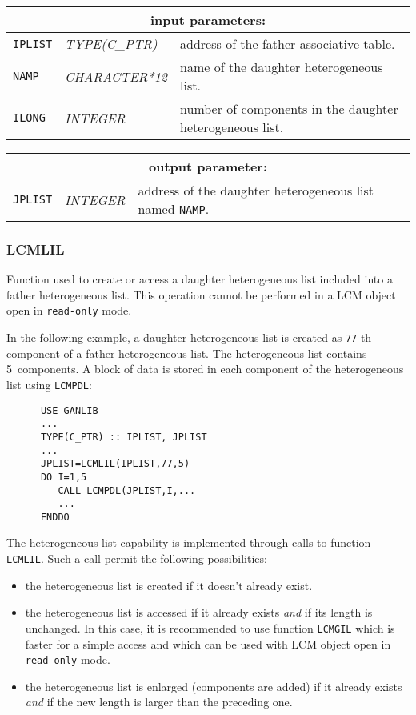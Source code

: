 \noindent
\begin{tabular}{|p{1.5cm}|p{3cm}|p{10cm}|}
\hline
\multicolumn{3}{|c|}{\bf input parameters:} \\
\hline
{\tt IPLIST} & {\it TYPE(C\_PTR)} & address of the father associative table. \\
\hline
{\tt NAMP} & {\it CHARACTER*12} & name of the daughter heterogeneous list. \\
\hline
{\tt ILONG} & {\it INTEGER} & number of components in the daughter heterogeneous list. \\
\hline
\end{tabular}

\vskip 0.8cm

\noindent
\begin{tabular}{|p{1.5cm}|p{3cm}|p{10cm}|}
\hline
\multicolumn{3}{|c|}{\bf output parameter:} \\
\hline
{\tt JPLIST} & {\it INTEGER} & address of the daughter heterogeneous list named {\tt NAMP}. \\
\hline
\end{tabular}

\subsubsection{LCMLIL}

Function used to create or access a daughter heterogeneous list included into a father heterogeneous list. This operation cannot be
performed in a LCM object open in {\tt read-only} mode.

\vskip 0.2cm

In the following example, a daughter heterogeneous list is created as {\tt 77}-th component
of a father heterogeneous list. The heterogeneous list contains 5~components. A block of data
is stored in each component of the heterogeneous list using {\tt LCMPDL}:

\begin{verbatim}
      USE GANLIB
      ...
      TYPE(C_PTR) :: IPLIST, JPLIST
      ...
      JPLIST=LCMLIL(IPLIST,77,5)
      DO I=1,5
         CALL LCMPDL(JPLIST,I,...
         ...
      ENDDO
\end{verbatim}

\vskip 0.2cm

The heterogeneous list capability is implemented through calls to function {\tt LCMLIL}. Such a
call permit the following possibilities:
\begin{itemize}
\item the heterogeneous list is created if it doesn't already exist.
\item the heterogeneous list is accessed if it already exists {\sl and} if its length is unchanged. In this case,
it is recommended to use function {\tt LCMGIL} which is faster for a simple access and which can be used
with LCM object open in {\tt read-only} mode.
\item the heterogeneous list is enlarged (components are added) if it already exists {\sl and} if the new length is larger than the preceding one.
\end{itemize}

